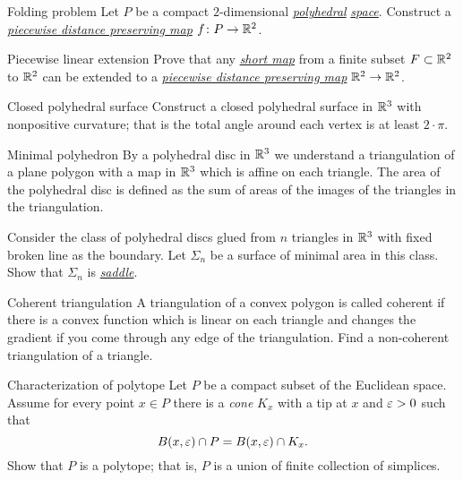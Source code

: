 \documentclass[twoside]{book}
\begin{document}
{\begin{pr}{}{Folding problem} \label{Folding problem}
Let $P$ be a compact $2$-dimensional 
\hyperref[Polyhedral space]{\emph{polyhedral}}
\hyperref[Polyhedral space]{\emph{space}}. 
Construct a 
\hyperref[Piecewise distance preserving map]{\emph{piecewise distance preserving map}} 
$f\colon P\to \mathbb{R}^2$.
\end{pr}

\begin{pr}{}{Piecewise linear extension} \label{iso-kirzhbraun}
Prove that any \hyperref[Short map]{\emph{short map}} from a finite subset $F\subset \mathbb{R}^2$
to 
$\mathbb{R}^2$ can be extended to a 
\hyperref[Piecewise distance preserving map]{\emph{piecewise distance preserving map}} 
$\mathbb{R}^2\to\mathbb{R}^2$.
\end{pr}

\begin{pr}{}{Closed polyhedral surface}\label{Closed polyhedral surface}
Construct a closed polyhedral surface in $\mathbb{R}^3$ with nonpositive curvature;
that is the total angle around each vertex is at least $2\cdot\pi$.
\end{pr}



\begin{pr}{}{Minimal polyhedron}\label{Minimal polyhedron}
By a polyhedral disc in $\mathbb{R}^3$
we understand a triangulation of a plane polygon with a map in $\mathbb{R}^3$ which is affine on each triangle.
The area of the polyhedral disc is defined as the sum of areas of the images of the triangles in the triangulation.

Consider the  class of polyhedral discs glued from $n$ triangles in $\mathbb{R}^3$ 
with fixed broken line as the boundary.
Let $\Sigma_n$ be a surface of minimal area in this class.
Show that $\Sigma_n$ is  \hyperref[Saddle surface]{\emph{saddle}}.
\end{pr}


\begin{pr}{}{Coherent triangulation}\label{Coherent triangulation} 
A triangulation of a convex polygon is called coherent if there is a convex function which is linear on each triangle and changes the gradient if you come through any edge of the triangulation.
Find a non-coherent triangulation of a triangle.
\end{pr}

\begin{pr}{}{Characterization of polytope}
\label{conic neighborhoods}
Let $P$ be a compact subset of the Euclidean space.
Assume for every point $x\in P$
there is a \emph{cone} $K_x$ with a tip at $x$ and $\varepsilon>0$
such that 
$$B(x,\varepsilon)\cap P
=
B(x,\varepsilon)\cap K_x.$$
Show that $P$ is a polytope; 
that is, $P$ is a union of finite collection of simplices.
\end{pr}

}
\end{document}
